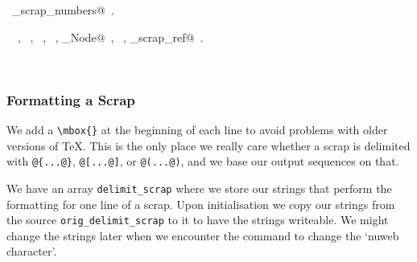 \documentclass{report}
\begin{document}
\begin{flushleft}
\begin{minipage}{\linewidth}
\begin{list}{}{\setlength{\itemsep}{-\parsep}\setlength{\itemindent}{-\leftmargin}}
\end{list}
\vspace{-2ex}
\footnotesize\addtolength{\baselineskip}{-1ex}
\begin{list}{}{\setlength{\itemsep}{-\parsep}\setlength{\itemindent}{-\leftmargin}}
\item \NWtxtIdentsDefed\nobreak\  \verb@print_scrap_numbers@\nobreak\ .\end{list}
\vspace{-2ex}
\footnotesize\addtolength{\baselineskip}{-1ex}
\begin{list}{}{\setlength{\itemsep}{-\parsep}\setlength{\itemindent}{-\leftmargin}}
\item \NWtxtIdentsUsed\nobreak\  \verb@FALSE@\nobreak\ , \verb@FILE@\nobreak\ , \verb@fputs@\nobreak\ , \verb@scraps@\nobreak\ , \verb@Scrap_Node@\nobreak\ , \verb@TRUE@\nobreak\ , \verb@write_scrap_ref@\nobreak\ .\end{list}
\end{minipage}\\[4ex]
\end{flushleft}
\subsubsection{Formatting a Scrap}

We add a \verb|\mbox{}| at the beginning of each line to avoid
problems with older versions of \TeX.
This is the only place we really care whether a scrap is
delimited with \verb|@{...@}|, \verb|@[...@]|, or \verb|@(...@)|,
and we base our output sequences on that.

We have an array \texttt{delimit\_scrap} where we store our strings
that perform the formatting for one line of a scrap. Upon
initialisation we copy our strings from the source
\texttt{orig\_delimit\_scrap} to it to have the strings writeable. We
might change the strings later when we encounter the command to change
the `nuweb character'.
\end{document}
